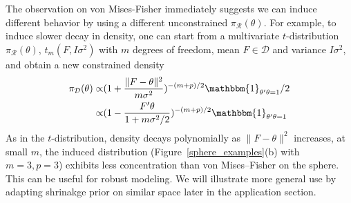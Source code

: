 \documentclass[10pt,fleqn]{article}
\newcommand{\be}{\begin{equation}\begin{aligned}}
\newcommand{\ee}{\end{aligned}\end{equation}}
\newcommand{\mc}[1]{\mathcal{#1}}
\DeclareMathOperator{\No}{No}
\DeclareMathOperator{\1}{\mathbbm{1}}
\begin{document}
The observation on von Mises-Fisher immediately suggests we can induce different behavior by using a different unconstrained $\pi_{\mc R}(\theta)$.
% 
For example, to induce slower decay in density, one can start from a
multivariate $t$-distribution $\pi_{\mc
R}(\theta)$, $t_m(F,I\sigma^2)$ with $m$ degrees of freedom,
mean $F\in \mc D$ and variance $I\sigma^2$, and obtain a new constrained density 
\be
\pi_{\mc
D}(\theta)
\propto &
(1+\frac{\|F-\theta\|^2}{m\sigma^2})^{-{(m+p)}/{2}}\mathbbm{1}_{\theta'\theta=1}/2\\
\propto &
(1-\frac{F'\theta}{1+m\sigma^2/2})^{-{(m+p)}/{2}}\mathbbm{1}_{\theta'\theta=1}
\ee
As in the $t$-distribution, density decays polynomially as $\|F-\theta\|^2$ increases, at small
$m$, the induced distribution (Figure~\ref{sphere_examples}(b) with $m=3,p=3$) exhibits less concentration than von
Mises--Fisher on the sphere. This can be useful for robust modeling.
We will illustrate more general use by adapting shrinakge prior on similar space later
in the application section. 
\end{document}
